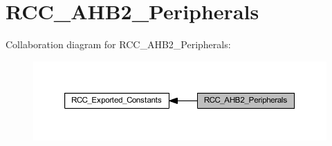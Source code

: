 \hypertarget{group___r_c_c___a_h_b2___peripherals}{}\section{R\+C\+C\+\_\+\+A\+H\+B2\+\_\+\+Peripherals}
\label{group___r_c_c___a_h_b2___peripherals}
Collaboration diagram for R\+C\+C\+\_\+\+A\+H\+B2\+\_\+\+Peripherals\+:\nopagebreak
\begin{figure}[H]
\begin{center}
\leavevmode
\includegraphics[width=350pt]{group___r_c_c___a_h_b2___peripherals}
\end{center}
\end{figure}
